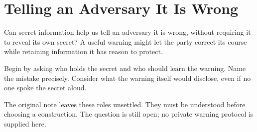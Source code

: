 \chapter{Telling an Adversary It Is Wrong}
\label{short:telling-an-adversary-it-is-wrong}

Can secret information help us tell an adversary it is wrong, without
requiring it to reveal its own secret? A useful warning might let the party correct its course
while retaining information it has reason to protect.

Begin by asking who holds the secret and who should learn the warning. Name
the mistake precisely. Consider what the warning itself would disclose, even
if no one spoke the secret aloud.

The original note leaves these roles unsettled. They must be understood
before choosing a construction. The question is still open; no private
warning protocol is supplied here.

